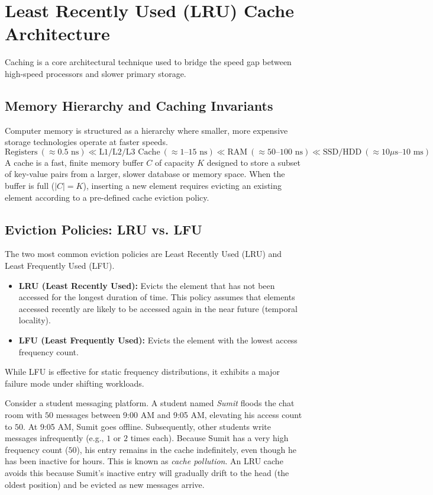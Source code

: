 \documentclass[10pt,journal,compsoc,onecolumn]{IEEEtran}
\begin{document}
\section{Least Recently Used (LRU) Cache Architecture}
\label{sec:lru_cache}

Caching is a core architectural technique used to bridge the speed gap between high-speed processors and slower primary storage.

\subsection{Memory Hierarchy and Caching Invariants}
Computer memory is structured as a hierarchy where smaller, more expensive storage technologies operate at faster speeds.
\[
\text{Registers} \ (\approx 0.5\text{ ns}) \ll \text{L1/L2/L3 Cache} \ (\approx 1\text{--}15\text{ ns}) \ll \text{RAM} \ (\approx 50\text{--}100\text{ ns}) \ll \text{SSD/HDD} \ (\approx 10\mu\text{s--}10\text{ ms})
\]
A cache is a fast, finite memory buffer $C$ of capacity $K$ designed to store a subset of key-value pairs from a larger, slower database or memory space. When the buffer is full ($|C| = K$), inserting a new element requires evicting an existing element according to a pre-defined cache eviction policy.

\subsection{Eviction Policies: LRU vs. LFU}
The two most common eviction policies are Least Recently Used (LRU) and Least Frequently Used (LFU).

\begin{itemize}
    \item \textbf{LRU (Least Recently Used):} Evicts the element that has not been accessed for the longest duration of time. This policy assumes that elements accessed recently are likely to be accessed again in the near future (temporal locality).
    \item \textbf{LFU (Least Frequently Used):} Evicts the element with the lowest access frequency count. 
\end{itemize}

While LFU is effective for static frequency distributions, it exhibits a major failure mode under shifting workloads.
\begin{example}
Consider a student messaging platform. A student named \emph{Sumit} floods the chat room with $50$ messages between 9:00 AM and 9:05 AM, elevating his access count to $50$. At 9:05 AM, Sumit goes offline. Subsequently, other students write messages infrequently (e.g., $1$ or $2$ times each). Because Sumit has a very high frequency count ($50$), his entry remains in the cache indefinitely, even though he has been inactive for hours. This is known as \emph{cache pollution}. An LRU cache avoids this because Sumit's inactive entry will gradually drift to the head (the oldest position) and be evicted as new messages arrive.
\end{example}
\end{document}
